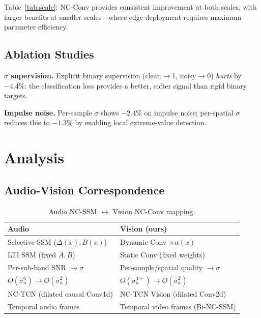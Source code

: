 \documentclass[runningheads]{llncs}
\begin{document}
Table~\ref{tab:scale}: NC-Conv provides consistent improvement at both scales, with larger benefits at smaller scales---where edge deployment requires maximum parameter efficiency.


\subsection{Ablation Studies}
\label{sec:ablation}

\noindent\textbf{$\sigma$ supervision.}
Explicit binary supervision (clean$\to$1, noisy$\to$0) \emph{hurts} by $-4.4\%$: the classification loss provides a better, softer signal than rigid binary targets.

\noindent\textbf{Impulse noise.}
Per-sample $\sigma$ shows $-2.4\%$ on impulse noise; per-spatial $\sigma$ reduces this to $-1.3\%$ by enabling local extreme-value detection.


\section{Analysis}
\label{sec:analysis}

\subsection{Audio-Vision Correspondence}

\begin{table}[t]
\centering
\caption{Audio NC-SSM $\leftrightarrow$ Vision NC-Conv mapping.}
\label{tab:mapping}
\small
\begin{tabular}{@{}ll@{}}
\toprule
\textbf{Audio} & \textbf{Vision (ours)} \\
\midrule
Selective SSM ($\Delta(x), B(x)$) & Dynamic Conv $\times \alpha(x)$ \\
LTI SSM (fixed $\overline{A}, \overline{B}$) & Static Conv (fixed weights) \\
Per-sub-band SNR $\to \sigma$ & Per-sample/spatial quality $\to \sigma$ \\
$O(\sigma_n^6) \to O(\sigma_n^2)$ & $O(\sigma_n^{4+}) \to O(\sigma_n^2)$ \\
NC-TCN (dilated causal Conv1d) & NC-TCN Vision (dilated Conv2d) \\
Temporal audio frames & Temporal video frames (Bi-NC-SSM) \\
\bottomrule
\end{tabular}
\end{table}
\end{document}
